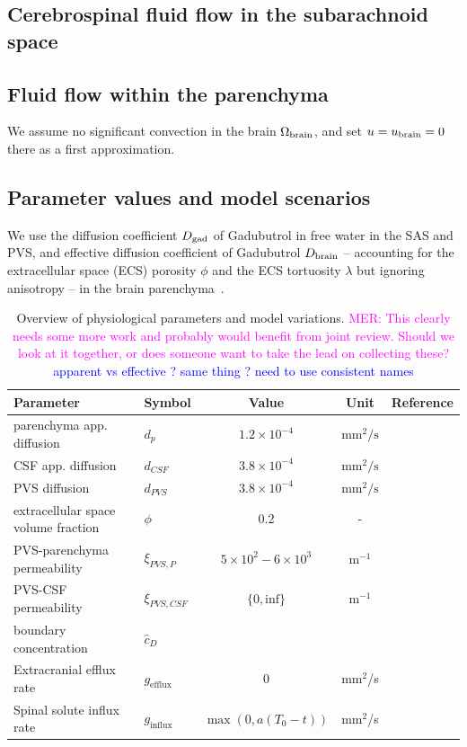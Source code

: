 \documentclass[fleqn,10pt]{wlscirep}
\newcommand{\rami}[1]{\textcolor{blue}{#1}}
\newcommand{\mer}[1]{\textcolor{magenta}{#1}}
\newcommand{\draft}[1]{\textcolor{gray}{#1}}
\begin{document}
\subsection*{Cerebrospinal fluid flow in the subarachnoid space}

\draft{\lipsum[1]}

\subsection*{Fluid flow within the parenchyma}

We assume no significant convection in the brain $\Omega_{\rm brain}$, and set $u = u_{\rm brain} = 0$ there as a first approximation. 


\subsection*{Parameter values and model scenarios}
We use the diffusion coefficient $D_{\rm gad}$ of Gadubutrol in free water in the SAS and PVS, and effective diffusion coefficient of Gadubutrol $D_{\rm brain}$ -- accounting for the extracellular space (ECS) porosity $\phi$ and the ECS tortuosity $\lambda$ but ignoring anisotropy  -- in the brain parenchyma~\cite{hornkjol2022csf}. 
\begin{table}
  \begin{center}
    \begin{tabular}{ll|ccc}
      \toprule
      Parameter& Symbol & Value & Unit& Reference\\
      \midrule
         parenchyma app. diffusion&  $d_p$&  $1.2 \times 10^{-4}$& $\text{mm}^2/\text{s}$  & \cite{valnes2020apparent}\\
         CSF app. diffusion&  $d_{CSF}$&  $3.8 \times 10^{-4}$& $\text{mm}^2/\text{s}$ & \cite{valnes2020apparent}\\
         PVS diffusion&  $d_{PVS}$&  $3.8 \times 10^{-4}$& $\text{mm}^2/\text{s}$ & \cite{valnes2020apparent}\\
         extracellular space volume fraction& $\phi$& 0.2& - &\cite{nicholson1981ion} \\
         PVS-parenchyma permeability&  $\xi_{PVS,P}$& $5 \times 10^{2} - 6 \times 10^{3} $  & $\text{m}^{-1}$ & \cite{koch2023estimates} \\
         PVS-CSF permeability&  $\xi_{PVS,CSF}$& $\{0, \text{inf}\}$ & $\text{m}^{-1}$ & \\ 
         boundary concentration& $\hat{c}_D$& & &\\ \hline
         Extracranial efflux rate & $g_{\mathrm{efflux}}$  & 0 & mm$^2$/s \\
         Spinal solute influx rate & $g_{\mathrm{influx}}$ & $\max(0, a(T_0 - t))$  & mm$^2$/s
    \end{tabular}
  \end{center}
  \caption{Overview of physiological parameters and model variations. \mer{MER: This clearly needs some more work and probably would benefit from joint review. Should we look at it together, or does someone want to take the lead on collecting these?} \rami{apparent vs effective ? same thing ? need to use consistent names}}
  \label{tab:overview}
\end{table}
\end{document}
